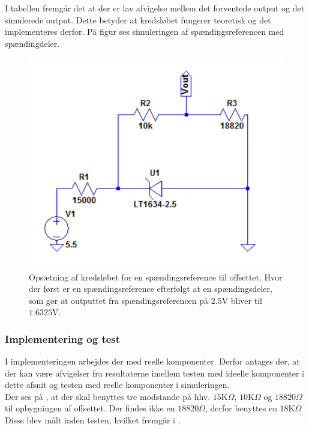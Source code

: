 I tabellen fremgår det at der er lav afvigelse mellem det forventede output og det simulerede output. Dette betyder at kredsløbet fungerer teoretisk og det implementeres derfor. På figur  ses simuleringen af spændingsreferencen med spændingdeler. 

\begin{figure}[H]
	\centering
	\includegraphics[scale=1.0]{figures/cProblemloesning/OffsetSpaendingsRef.PNG}
	\caption{Opsætning af kredsløbet for en spændingsreference til offsettet. Hvor der først er en spændingsreference efterfølgt at en spændingsdeler, som gør at outputtet fra spændingsreferencen på $2.5$V bliver til $1.6325$V. }
	\label{fig:Spaendingsreference_offset}
\end{figure}

\subsubsection{Implementering og test}
I implementeringen arbejdes der med reelle komponenter. Derfor antages der, at der kan være afvigelser fra resultaterne imellem testen med ideelle komponenter i dette afsnit og testen med reelle komponenter i simuleringen. \\
Der ses på , at der skal benyttes tre modstande på hhv. $15$K$\Omega$, $10$K$\Omega$ og $18820 \Omega$  til opbygningen af offsettet. Der findes ikke en $18820 \Omega$, derfor benyttes en $18$K$ \Omega$  Disse blev målt inden testen, hvilket fremgår i .

